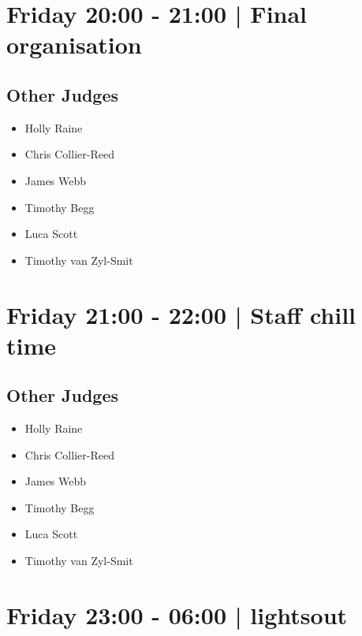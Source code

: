 \documentclass[10pt]{article}
\begin{document}
            \section*{Friday 20:00
        -
        21:00
        |
         Final organisation}
        
                
        \subsection*{Other Judges}
        
            \begin{itemize}
                            \item Holly Raine
                            \item Chris Collier-Reed
                            \item James Webb
                            \item Timothy Begg
                            \item Luca Scott
                            \item Timothy van Zyl-Smit
                        \end{itemize}
        

            \section*{Friday 21:00
        -
        22:00
        |
         Staff chill time}
        
                
        \subsection*{Other Judges}
        
            \begin{itemize}
                            \item Holly Raine
                            \item Chris Collier-Reed
                            \item James Webb
                            \item Timothy Begg
                            \item Luca Scott
                            \item Timothy van Zyl-Smit
                        \end{itemize}
        

            \section*{Friday 23:00
        -
        06:00
        |
         lightsout}
        
\end{document}
